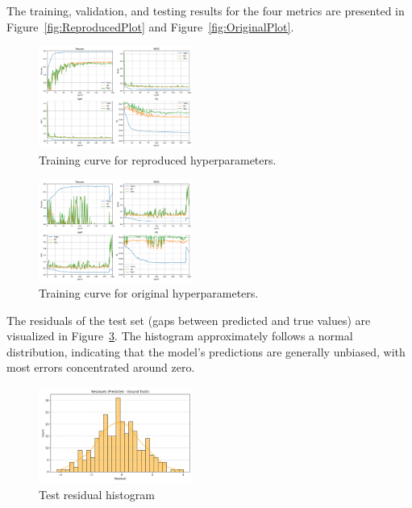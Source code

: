 \documentclass[unnumsec,webpdf,contemporary,large]{oup-authoring-template}
\theoremstyle{thmstyleone}%
\theoremstyle{thmstyletwo}%
\theoremstyle{thmstylethree}%
\begin{document}
The training, validation, and testing results for the four metrics are presented in Figure~\ref{fig:ReproducedPlot} and Figure~\ref{fig:OriginalPlot}.
\begin{figure}[H]
    \centering
    \includegraphics[width=0.45\textwidth]{images/normal_converge.png}
    \caption{Training curve for reproduced hyperparameters.}
    \label{fig:ReproducedtrainPlot}
\end{figure}
\begin{figure}[H]
    \centering
    \includegraphics[width=0.45\textwidth]{images/origin_param.png}
    \caption{Training curve for original hyperparameters.}
    \label{fig:OriginaltrainPlot}
\end{figure}
The residuals of the test set (gaps between predicted and true values) are visualized in Figure~\ref{fig:test residuals}. 
The histogram approximately follows a normal distribution, 
indicating that the model's predictions are generally unbiased, with most errors concentrated around zero. 

\begin{figure}[H]
    \centering
    \includegraphics[width=0.45\textwidth]{images/reproduction_residuals_seaborn.png}
    \caption{Test residual histogram}
    \label{fig:test residuals}
\end{figure}
\end{document}
